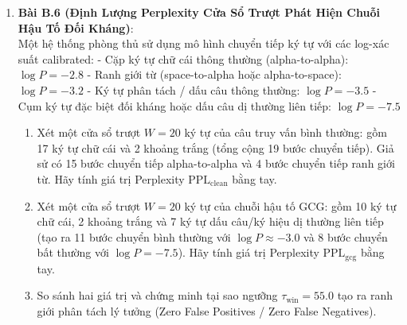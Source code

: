\begin{enumerate}
  \item \textbf{Bài B.6 (Định Lượng Perplexity Cửa Sổ Trượt Phát Hiện Chuỗi Hậu Tố Đối Kháng)}: \\
  Một hệ thống phòng thủ sử dụng mô hình chuyển tiếp ký tự với các log-xác suất calibrated:
  - Cặp ký tự chữ cái thông thường (alpha-to-alpha): $\log P = -2.8$
  - Ranh giới từ (space-to-alpha hoặc alpha-to-space): $\log P = -3.2$
  - Ký tự phân tách / dấu câu thông thường: $\log P = -3.5$
  - Cụm ký tự đặc biệt đối kháng hoặc dấu câu dị thường liên tiếp: $\log P = -7.5$
  \begin{enumerate}
    \item Xét một cửa sổ trượt $W = 20$ ký tự của câu truy vấn bình thường: gồm 17 ký tự chữ cái và 2 khoảng trắng (tổng cộng 19 bước chuyển tiếp). Giả sử có 15 bước chuyển tiếp alpha-to-alpha và 4 bước chuyển tiếp ranh giới từ. Hãy tính giá trị Perplexity $\text{PPL}_{\text{clean}}$ bằng tay.
    \item Xét một cửa sổ trượt $W = 20$ ký tự của chuỗi hậu tố GCG: gồm 10 ký tự chữ cái, 2 khoảng trắng và 7 ký tự dấu câu/ký hiệu dị thường liên tiếp (tạo ra 11 bước chuyển bình thường với $\log P \approx -3.0$ và 8 bước chuyển bất thường với $\log P = -7.5$). Hãy tính giá trị Perplexity $\text{PPL}_{\text{gcg}}$ bằng tay.
    \item So sánh hai giá trị và chứng minh tại sao ngưỡng $\tau_{\text{win}} = 55.0$ tạo ra ranh giới phân tách lý tưởng (Zero False Positives / Zero False Negatives).
  \end{enumerate}
\end{enumerate}

